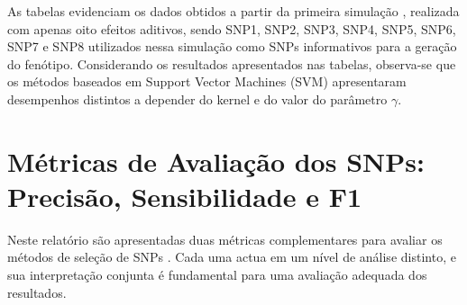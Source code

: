 \documentclass[
    12pt,
    a4paper,
    oneside,
    english,
    french,
    spanish,
    brazil
    ]{abntex2}
\newcommand{\novo}[1]{\textcolor{corNova}{#1}}
\begin{document}
As tabelas evidenciam os dados obtidos a partir da primeira simulação \cite{de2014snps,Souza2022}, realizada com apenas oito efeitos aditivos, sendo SNP1, SNP2, SNP3, SNP4, SNP5, SNP6, SNP7 e SNP8 utilizados nessa simulação como SNPs informativos para a geração do fenótipo. Considerando os resultados apresentados nas tabelas, observa-se que os métodos baseados em Support Vector Machines (SVM) apresentaram desempenhos distintos a depender do kernel e do valor do parâmetro $\gamma$.


\chapter*{Métricas de Avaliação dos SNPs: Precisão, Sensibilidade e F1}

\novo{Neste relatório são apresentadas duas métricas complementares para avaliar os métodos de seleção de SNPs \cite{fawcett2006introduction,Adeline2015}. Cada uma actua em um nível de análise distinto, e sua interpretação conjunta é fundamental para uma avaliação adequada dos resultados.}
\end{document}
